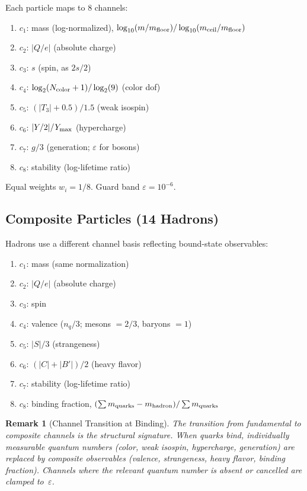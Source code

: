 \documentclass[
  aps,
  prd,
  twocolumn,
  superscriptaddress,
  nofootinbib,
  floatfix
]{revtex4-2}
\newtheorem{remark}{Remark}
\newcommand{\eps}{\varepsilon}
\begin{document}
Each particle maps to 8 channels:
\begin{enumerate}
\item $c_1$: mass (log-normalized),
  $\log_{10}(m/m_{\rm floor}) / \log_{10}(m_{\rm ceil}/m_{\rm floor})$
\item $c_2$: $|Q/e|$ (absolute charge)
\item $c_3$: $s$ (spin, as $2s/2$)
\item $c_4$: $\log_2(N_{\rm color}+1) / \log_2(9)$ (color dof)
\item $c_5$: $(|T_3|+0.5)/1.5$ (weak isospin)
\item $c_6$: $|Y/2|/Y_{\rm max}$ (hypercharge)
\item $c_7$: $g/3$ (generation; $\eps$ for bosons)
\item $c_8$: stability (log-lifetime ratio)
\end{enumerate}
Equal weights $w_i = 1/8$.  Guard band $\eps = 10^{-6}$.

\subsection{Composite Particles (14 Hadrons)}

Hadrons use a different channel basis reflecting bound-state
observables:
\begin{enumerate}
\item $c_1$: mass (same normalization)
\item $c_2$: $|Q/e|$ (absolute charge)
\item $c_3$: spin
\item $c_4$: valence ($n_q/3$; mesons $= 2/3$, baryons $= 1$)
\item $c_5$: $|S|/3$ (strangeness)
\item $c_6$: $(|C|+|B'|)/2$ (heavy flavor)
\item $c_7$: stability (log-lifetime ratio)
\item $c_8$: binding fraction,
  $(\sum m_{\rm quarks} - m_{\rm hadron}) / \sum m_{\rm quarks}$
\end{enumerate}

\begin{remark}[Channel Transition at Binding]\label{rem:transition}
The transition from fundamental to composite channels \emph{is}
the structural signature.  When quarks bind, individually
measurable quantum numbers (color, weak isospin, hypercharge,
generation) are replaced by composite observables (valence,
strangeness, heavy flavor, binding fraction).  Channels where the
relevant quantum number is absent or cancelled are clamped
to~$\eps$.
\end{remark}
\end{document}
